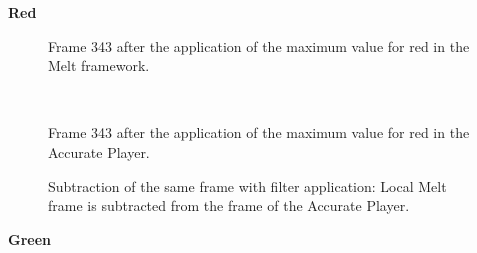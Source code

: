\documentclass[../MasterThesis.tex]{subfiles}
\begin{document}

\textbf{Red}

\vspace*{-1.2em}

\begin{minipage}{0.48\textwidth}
	
	\begin{figure}[H]
		\begin{center}
			\caption[Frame 343 after the application of the red filter in the Melt framework.]{Frame 343 after the application of the maximum value for red in the Melt framework.}
		\end{center}
	\end{figure}
\end{minipage}\begin{minipage}{0.04\textwidth}
	\ 
\end{minipage}\begin{minipage}{0.48\textwidth}
	
	\begin{figure}[H]
		\begin{center}
			\caption[Frame 343 after the application of the red filter in the Accurate Player.]{Frame 343 after the application of the maximum value for red in the Accurate Player.}
		\end{center}
	\end{figure}
\end{minipage}

\vspace*{-1em}

\begin{figure}[H]
	\begin{center}
		\caption[Subtraction of the two different frames (Accurate Player - Melt).]{Subtraction of the same frame with filter application: Local Melt frame is subtracted from the frame of the Accurate Player.}
	\end{center}
\end{figure}



\vspace*{-1em}



\textbf{Green}

\vspace*{-1em}
\end{document}
